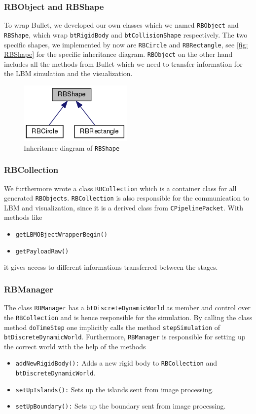 \subsubsection*{RBObject and RBShape}
To wrap Bullet, we developed our own classes which we named \texttt{RBObject} and \texttt{RBShape}, which wrap \texttt{btRigidBody} and \texttt{btCollisionShape} respectively. The two specific shapes, we implemented by now are \texttt{RBCircle} and \texttt{RBRectangle}, see \autoref{fig: RBShape} for the specific inheritance diagram. \texttt{RBObject} on the other hand includes all the methods from Bullet which we need to transfer information for the LBM simulation and the visualization. 
\begin{figure}[ht]
\centering
\includegraphics[scale=0.5]{img/RigidBodies/RBShapeGraph.png}
\caption{Inheritance diagram of \texttt{RBShape}}
\label{fig: RBShape}
\end{figure}

\subsubsection*{RBCollection}
We furthermore wrote a class \texttt{RBCollection} which is a container class for all generated \texttt{RBObjects}. \texttt{RBCollection} is also responsible for the communication to LBM and visualization, since it is a derived class from \texttt{CPipelinePacket}. With methods like 
\begin{itemize}
\item \texttt{getLBMOBjectWrapperBegin()}
\item \texttt{getPayloadRaw()}
\end{itemize} 
it gives access to different informations transferred between the stages. 

\subsubsection*{RBManager}
The class \texttt{RBManager} has a \texttt{btDiscreteDynamicWorld} as member and control over the \texttt{RBCollection} and is hence responsible for the simulation. By calling the class method \texttt{doTimeStep} one implicitly calls the method \texttt{stepSimulation} of \texttt{btDiscreteDynamicWorld}. Furthermore, \texttt{RBManager} is responsible for setting up the correct world with the help of the methods 
\begin{itemize}
\item \texttt{addNewRigidBody():} Adds a new rigid body to \texttt{RBCollection} and \texttt{btDiscreteDynamicWorld}.
\item \texttt{setUpIslands():} Sets up the islands sent from image processing.
\item \texttt{setUpBoundary():} Sets up the boundary sent from image processing.
\end{itemize}

